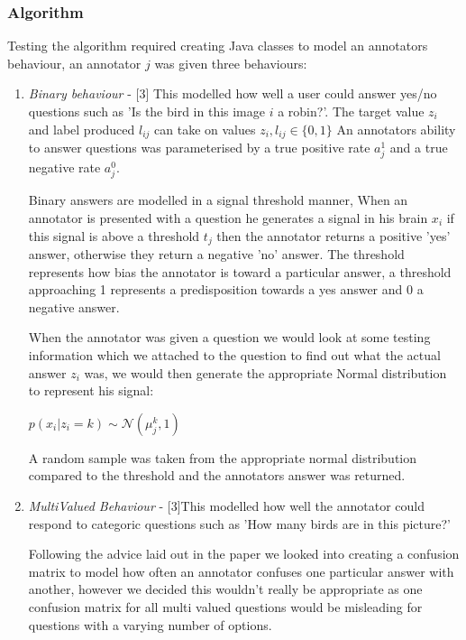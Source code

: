 \documentclass[11pt]{article}
\begin{document}
\subsubsection{Algorithm}
Testing the algorithm required creating Java classes to model an annotators behaviour, an annotator $j$ was given three behaviours:

\begin{enumerate}
\item
\emph{Binary behaviour} - [3] This modelled how well a user could answer yes/no questions such as 'Is the bird in this image $i$ a robin?'. The target
value $z_{i}$ and label produced $l_{ij}$ can take on values $z_{i}, l_{ij} \in \{0, 1\}$ An annotators ability to answer questions was 
parameterised by a true positive rate $a_{j}^{1}$ and a true negative rate $a_{j}^{0}$.

Binary answers are modelled in a 
signal threshold manner, When an annotator is presented with a question he generates a signal in his brain $x_{i}$ if this signal is above
a threshold $t_{j}$ then the annotator returns a positive 'yes' answer, otherwise they return a negative 'no' answer. The threshold represents
how bias the annotator is toward a particular answer, a threshold approaching 1 represents a predisposition towards a yes answer and 0 a 
negative answer.

When the annotator was given a question
we would look at some testing information which we attached to the question to find out what the actual answer $z_{i}$ was, we would then generate
the appropriate Normal distribution to represent his signal:

$p(x_{i} | z_{i} = k) \sim \mathcal{N}(\mu_{j}^{k} , 1)$

A random sample was taken from the appropriate normal distribution compared to the threshold and the annotators answer was returned. 

\item
\emph{MultiValued Behaviour} - [3]This modelled how well the annotator could respond to categoric questions such as 'How many birds are in this picture?' 

Following the advice laid out in the paper we looked into creating a confusion matrix to model how often an annotator confuses one particular answer with another, however we decided this wouldn't really be appropriate as one confusion matrix for all multi valued questions would be misleading for questions with a varying number of options. 


\end{enumerate}
\end{document}
